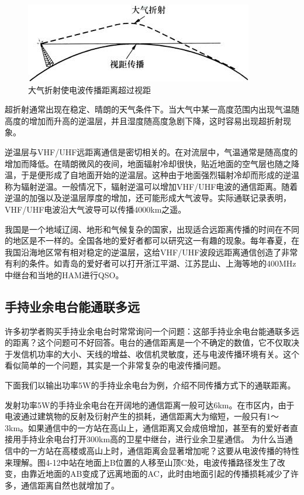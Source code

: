 \documentclass[12pt,UTF8]{ctexbook}
\begin{document}
\begin{figure}[htbp]
	\centering
	\includegraphics[width=0.7\linewidth]{54}
	\caption{大气折射使电波传播距离超过视距}
	\label{fig:1}
\end{figure}

超折射通常出现在稳定、晴朗的天气条件下。当大气中某一高度范围内出现气温随高度的增加而升高的逆温层，并且湿度随高度急剧下降，这时容易出现超折射现象。

逆温层与VHF/UHF远距离通信是密切相关的。在对流层中，气温通常是随高度的增加而降低。在晴朗微风的夜间，地面辐射冷却很快，贴近地面的空气层也随之降温，于是便形成了自地面开始的逆温层。这种由于地面强烈辐射冷却而形成的逆温称为辐射逆温。一般情况下，辐射逆温可以增加VHF/UHF电波的通信距离。随着逆温的加强以及逆温层厚度的增加，还可能形成大气波导。实际通联记录表明，VHF/UHF电波沿大气波导可以传播4000km之遥。

我国是一个地域辽阔、地形和气候复杂的国家，出现适合远距离传播的时间在不同的地区是不一样的。全国各地的爱好者都可以研究这一有趣的现象。每年春夏，在我国沿海地区常有相对稳定的逆温层，这给VHF/UHF波段远距离通信创造了非常有利的条件。如青岛的爱好者可以打开浙江平湖、江苏昆山、上海等地的400MHz中继台和当地的HAM进行QSO。

\subsection{手持业余电台能通联多远}

许多初学者购买手持业余电台时常常询问一个问题：这部手持业余电台能通联多远的距离？这个问题可不好回答。电台的通信距离是一个不确定的数值，它不仅取决于发信机功率的大小、天线的增益、收信机灵敏度，还与电波传播环境有关。这个看似简单的一个问题，其实是一个非常复杂的电波传播问题。

下面我们以输出功率5W的手持业余电台为例，介绍不同传播方式下的通联距离。

发射功率5W的手持业余电台在开阔地的通信距离一般可达6km。在市区内，由于电波通过建筑物的反射及衍射产生的损耗，通信距离大为缩短，一般只有1～3km。如果通信中的一方站在高山上，通信距离又会成倍增加，甚至有的爱好者直接用手持业余电台打开300km高的卫星中继台，进行业余卫星通信。
为什么当通信中的一方站在高楼或高山上时，通信距离会显著增加呢？这要从电波传播的特性来理解。图4-12中站在地面上B位置的人移至山顶C处，电波传播路径发生了改变，由靠近地面的AB变成了远离地面的AC，此时由地面引起的传播损耗减少了许多，通信距离自然也就增加了。
\end{document}
